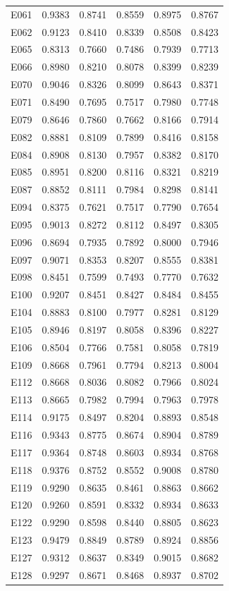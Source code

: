 \begin{table}[ht]
\begin{tabular}{rrrrrr}
  E061 & 0.9383 & 0.8741 & 0.8559 & 0.8975 & 0.8767 \\ 
  E062 & 0.9123 & 0.8410 & 0.8339 & 0.8508 & 0.8423 \\ 
  E065 & 0.8313 & 0.7660 & 0.7486 & 0.7939 & 0.7713 \\ 
  E066 & 0.8980 & 0.8210 & 0.8078 & 0.8399 & 0.8239 \\ 
  E070 & 0.9046 & 0.8326 & 0.8099 & 0.8643 & 0.8371 \\ 
  E071 & 0.8490 & 0.7695 & 0.7517 & 0.7980 & 0.7748 \\ 
  E079 & 0.8646 & 0.7860 & 0.7662 & 0.8166 & 0.7914 \\ 
  E082 & 0.8881 & 0.8109 & 0.7899 & 0.8416 & 0.8158 \\ 
  E084 & 0.8908 & 0.8130 & 0.7957 & 0.8382 & 0.8170 \\ 
  E085 & 0.8951 & 0.8200 & 0.8116 & 0.8321 & 0.8219 \\ 
  E087 & 0.8852 & 0.8111 & 0.7984 & 0.8298 & 0.8141 \\ 
  E094 & 0.8375 & 0.7621 & 0.7517 & 0.7790 & 0.7654 \\ 
  E095 & 0.9013 & 0.8272 & 0.8112 & 0.8497 & 0.8305 \\ 
  E096 & 0.8694 & 0.7935 & 0.7892 & 0.8000 & 0.7946 \\ 
  E097 & 0.9071 & 0.8353 & 0.8207 & 0.8555 & 0.8381 \\ 
  E098 & 0.8451 & 0.7599 & 0.7493 & 0.7770 & 0.7632 \\ 
  E100 & 0.9207 & 0.8451 & 0.8427 & 0.8484 & 0.8455 \\ 
  E104 & 0.8883 & 0.8100 & 0.7977 & 0.8281 & 0.8129 \\ 
  E105 & 0.8946 & 0.8197 & 0.8058 & 0.8396 & 0.8227 \\ 
  E106 & 0.8504 & 0.7766 & 0.7581 & 0.8058 & 0.7819 \\ 
  E109 & 0.8668 & 0.7961 & 0.7794 & 0.8213 & 0.8004 \\ 
  E112 & 0.8668 & 0.8036 & 0.8082 & 0.7966 & 0.8024 \\ 
  E113 & 0.8665 & 0.7982 & 0.7994 & 0.7963 & 0.7978 \\ 
  E114 & 0.9175 & 0.8497 & 0.8204 & 0.8893 & 0.8548 \\ 
  E116 & 0.9343 & 0.8775 & 0.8674 & 0.8904 & 0.8789 \\ 
  E117 & 0.9364 & 0.8748 & 0.8603 & 0.8934 & 0.8768 \\ 
  E118 & 0.9376 & 0.8752 & 0.8552 & 0.9008 & 0.8780 \\ 
  E119 & 0.9290 & 0.8635 & 0.8461 & 0.8863 & 0.8662 \\ 
  E120 & 0.9260 & 0.8591 & 0.8332 & 0.8934 & 0.8633 \\ 
  E122 & 0.9290 & 0.8598 & 0.8440 & 0.8805 & 0.8623 \\ 
  E123 & 0.9479 & 0.8849 & 0.8789 & 0.8924 & 0.8856 \\ 
  E127 & 0.9312 & 0.8637 & 0.8349 & 0.9015 & 0.8682 \\ 
  E128 & 0.9297 & 0.8671 & 0.8468 & 0.8937 & 0.8702 \\ 
   \hline
\end{tabular}
\end{table}
